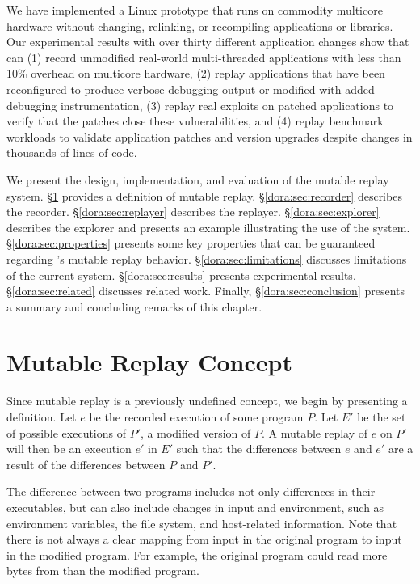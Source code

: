 We have implemented a {\dora} Linux prototype that runs on
commodity multicore hardware without changing, relinking, or
recompiling applications or libraries.  Our experimental results with
over thirty different application changes show that {\dora} can (1)
record unmodified real-world multi-threaded applications with less
than 10\% overhead on multicore hardware, (2) replay applications that
have been reconfigured to produce verbose debugging output or modified
with added debugging instrumentation, (3) replay real exploits on
patched applications to verify that the patches close these
vulnerabilities, and (4) replay benchmark workloads to validate
application patches and version upgrades despite changes in thousands of lines
of code.

We present the design, implementation, and evaluation of the
{\dora} mutable replay system.
\S\ref{dora:sec:definition} provides a definition of mutable replay.
\S\ref{dora:sec:recorder} describes the {\dora} recorder.
\S\ref{dora:sec:replayer} describes the {\dora} replayer.
\S\ref{dora:sec:explorer} describes the {\dora} explorer and presents an
example illustrating the use of the system.
\S\ref{dora:sec:properties} presents some key properties that can be guaranteed regarding
{\dora}'s mutable replay behavior.
\S\ref{dora:sec:limitations} discusses limitations of the current system.
\S\ref{dora:sec:results} presents experimental results.
\S\ref{dora:sec:related} discusses related work.
Finally, \S\ref{dora:sec:conclusion} presents a summary and concluding remarks of this chapter.

\section{Mutable Replay Concept}
\label{dora:sec:definition}

Since mutable replay is a previously undefined concept, we begin by
presenting a definition.  Let $e$ be the recorded execution of some
program $P$. Let $E'$ be the set of possible executions of $P'$, a
modified version of $P$. A mutable replay of $e$ on $P'$ will then be
an execution $e'$ in $E'$ such that the differences between $e$ and
$e'$ are a result of the differences between $P$ and $P'$.

The difference between two programs includes not only differences in
their executables, but can also include changes in input and
environment, such as environment variables, the file system,
and host-related information.
Note that there is
not always a clear mapping from input in the original program to input
in the modified program. For example, the original program could read more bytes
from  than the modified program.

